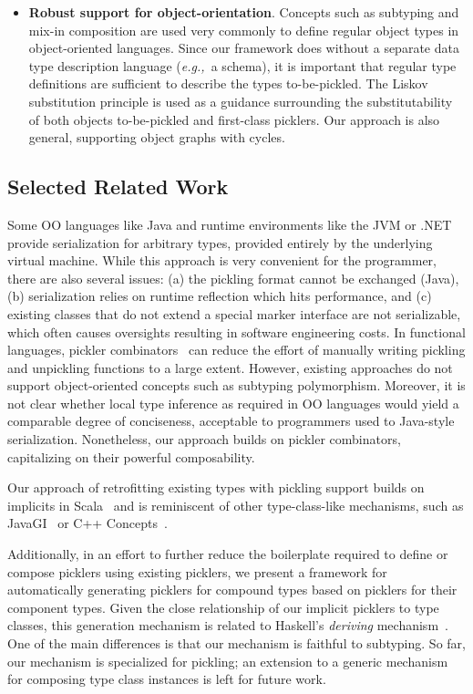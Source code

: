 \documentclass[10pt]{sigplanconf}
\theoremstyle{definition}
\theoremstyle{definition}
\newcommand{\eg}{{\em e.g.,~}}
\begin{document}
\begin{itemize}
\item {\bf Robust support for object-orientation}. Concepts such as subtyping
and mix-in composition are used very commonly to define
regular object types in object-oriented languages. Since our framework does
without a separate data type description language (\eg a schema), it
is important that regular type definitions are sufficient to describe the
types to-be-pickled. The Liskov substitution principle is used as a guidance
surrounding the substitutability of both objects to-be-pickled and first-class
picklers. Our approach is also general, supporting object graphs with cycles.
\end{itemize}


\subsection{Selected Related Work}

Some OO languages like Java and runtime environments like the JVM or
.NET provide serialization for arbitrary types, provided entirely by
the underlying virtual machine. While this approach is very convenient
for the programmer, there are also several issues: (a) the pickling
format cannot be exchanged (Java), (b) serialization relies on runtime
reflection which hits performance, and (c) existing classes that do
not extend a special marker interface are not serializable, which
often causes oversights resulting in software engineering costs. In
functional languages, pickler
combinators~\cite{Kennedy2004,Elsman2005} can reduce the effort of
manually writing pickling and unpickling functions to a large
extent. However, existing approaches do not support object-oriented
concepts such as subtyping polymorphism. Moreover, it is not clear
whether local type inference as required in OO languages would yield a
comparable degree of conciseness, acceptable to programmers used to
Java-style serialization.  Nonetheless, our approach builds on pickler
combinators, capitalizing on their powerful composability.

Our approach of retrofitting existing types with pickling support
builds on implicits in Scala~\cite{Oliveira2010} and is reminiscent of
other type-class-like mechanisms, such as JavaGI~\cite{WehrT11} or C++
Concepts~\cite{ReisS06}.

Additionally, in an effort to further reduce the boilerplate required
to define or compose picklers using existing picklers, we present a
framework for automatically generating picklers for compound types
based on picklers for their component types. Given the close
relationship of our implicit picklers to type classes, this generation
mechanism is related to Haskell's {\em deriving}
mechanism~\cite{MagalhaesDJL10}. One of the main differences is that
our mechanism is faithful to subtyping. So far, our mechanism is
specialized for pickling; an extension to a generic mechanism for
composing type class instances is left for future work.
\end{document}
